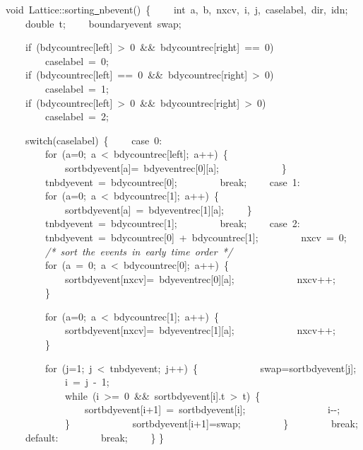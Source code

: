 {void\ Lattice::sorting\underline\ nbevent()\ \{
\ \ \ \ int\ a,\ b,\ nxcv,\ i,\ j,\ caselabel,\ dir,\ idn;
\ \ \ \ double\ t;
\ \ \ \ boundaryevent\ swap;

\ \ \ \ if\ (bdycountrec[left]\ >{}\ 0\ \&\&\ bdycountrec[right]\ ==\ 0)
\ \ \ \ \ \ \ \ caselabel\ =\ 0;
\ \ \ \ if\ (bdycountrec[left]\ ==\ 0\ \&\&\ bdycountrec[right]\ >{}\ 0)
\ \ \ \ \ \ \ \ caselabel\ =\ 1;
\ \ \ \ if\ (bdycountrec[left]\ >{}\ 0\ \&\&\ bdycountrec[right]\ >{}\ 0)
\ \ \ \ \ \ \ \ caselabel\ =\ 2;

\ \ \ \ switch(caselabel)\ \{
\ \ \ \ case\ 0:
\ \ \ \ \ \ \ \ for\ (a=0;\ a\ <{}\ bdycountrec[left];\ a++)\ \{
\ \ \ \ \ \ \ \ \ \ \ \ sortbdyevent[a]=\ bdyeventrec[0][a];
\ \ \ \ \ \ \ \ \ \ \ \ \}
\ \ \ \ \ \ \ \ tnbdyevent\ =\ bdycountrec[0];
\ \ \ \ \ \ \ \ break;
\ \ \ \ case\ 1:
\ \ \ \ \ \ \ \ for\ (a=0;\ a\ <{}\ bdycountrec[1];\ a++)\ \{
\ \ \ \ \ \ \ \ \ \ \ \ sortbdyevent[a]\ =\ bdyeventrec[1][a];
\ \ \ \ \}
\ \ \ \ \ \ \ \ tnbdyevent\ =\ bdycountrec[1];
\ \ \ \ \ \ \ \ break;
\ \ \ \ case\ 2:
\ \ \ \ \ \ \ \ tnbdyevent\ =\ bdycountrec[0]\ +\ bdycountrec[1];
\ \ \ \ \ \ \ \ nxcv\ =\ 0;
\ \ \ \ \ \ \ \ \textsl{/*\ sort\ the\ events\ in\ early\ time\ order\ */}
\ \ \ \ \ \ \ \ for\ (a\ =\ 0;\ a\ <{}\ bdycountrec[0];\ a++)\ \{
\ \ \ \ \ \ \ \ \ \ \ \ sortbdyevent[nxcv]=\ bdyeventrec[0][a];
\ \ \ \ \ \ \ \ \ \ \ \ nxcv++;
\ \ \ \ \ \ \ \ \}

\ \ \ \ \ \ \ \ for\ (a=0;\ a\ <{}\ bdycountrec[1];\ a++)\ \{
\ \ \ \ \ \ \ \ \ \ \ \ sortbdyevent[nxcv]=\ bdyeventrec[1][a];
\ \ \ \ \ \ \ \ \ \ \ \ nxcv++;
\ \ \ \ \ \ \ \ \}

\ \ \ \ \ \ \ \ for\ (j=1;\ j\ <{}\ tnbdyevent;\ j++)\ \{
\ \ \ \ \ \ \ \ \ \ \ \ swap=sortbdyevent[j];
\ \ \ \ \ \ \ \ \ \ \ \ i\ =\ j\ -{}\ 1;
\ \ \ \ \ \ \ \ \ \ \ \ while\ (i\ >{}=\ 0\ \&\&\ sortbdyevent[i].t\ >{}\ t)\ \{
\ \ \ \ \ \ \ \ \ \ \ \ \ \ \ \ sortbdyevent[i+1]\ =\ sortbdyevent[i];
\ \ \ \ \ \ \ \ \ \ \ \ \ \ \ \ i-{}-{};
\ \ \ \ \ \ \ \ \ \ \ \ \}
\ \ \ \ \ \ \ \ \ \ \ \ sortbdyevent[i+1]=swap;
\ \ \ \ \ \ \ \ \}
\ \ \ \ \ \ \ \ break;
\ \ \ \ default:
\ \ \ \ \ \ \ \ break;
\ \ \ \ \}
\}

 }
\normalfont\normalsize

